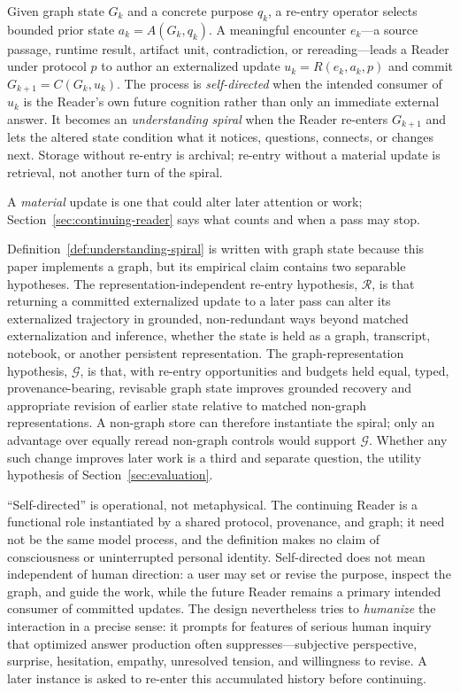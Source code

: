 \begin{definition}
\label{def:understanding-spiral}
Given graph state $G_k$ and a concrete purpose $q_k$, a re-entry operator selects bounded prior state $a_k=A(G_k,q_k)$. A meaningful encounter $e_k$---a source passage, runtime result, artifact unit, contradiction, or rereading---leads a Reader under protocol $p$ to author an externalized update $u_k=R(e_k,a_k,p)$ and commit $G_{k+1}=C(G_k,u_k)$. The process is \emph{self-directed} when the intended consumer of $u_k$ is the Reader's own future cognition rather than only an immediate external answer. It becomes an \emph{understanding spiral} when the Reader re-enters $G_{k+1}$ and lets the altered state condition what it notices, questions, connects, or changes next. Storage without re-entry is archival; re-entry without a material update is retrieval, not another turn of the spiral.
\end{definition}

A \emph{material} update is one that could alter later attention or work; Section~\ref{sec:continuing-reader} says what counts and when a pass may stop.

Definition~\ref{def:understanding-spiral} is written with graph state because this paper implements a graph, but its empirical claim contains two separable hypotheses. The representation-independent re-entry hypothesis, \(\mathcal{R}\), is that returning a committed externalized update to a later pass can alter its externalized trajectory in grounded, non-redundant ways beyond matched externalization and inference, whether the state is held as a graph, transcript, notebook, or another persistent representation. The graph-representation hypothesis, \(\mathcal{G}\), is that, with re-entry opportunities and budgets held equal, typed, provenance-bearing, revisable graph state improves grounded recovery and appropriate revision of earlier state relative to matched non-graph representations. A non-graph store can therefore instantiate the spiral; only an advantage over equally reread non-graph controls would support \(\mathcal{G}\). Whether any such change improves later work is a third and separate question, the utility hypothesis of Section~\ref{sec:evaluation}.

``Self-directed'' is operational, not metaphysical. The continuing Reader is a functional role instantiated by a shared protocol, provenance, and graph; it need not be the same model process, and the definition makes no claim of consciousness or uninterrupted personal identity. Self-directed does not mean independent of human direction: a user may set or revise the purpose, inspect the graph, and guide the work, while the future Reader remains a primary intended consumer of committed updates. The design nevertheless tries to \emph{humanize} the interaction in a precise sense: it prompts for features of serious human inquiry that optimized answer production often suppresses---subjective perspective, surprise, hesitation, empathy, unresolved tension, and willingness to revise. A later instance is asked to re-enter this accumulated history before continuing.

